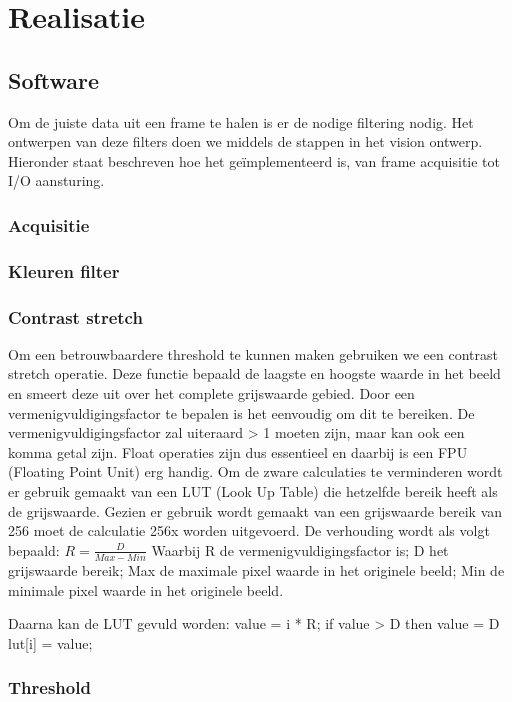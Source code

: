 \chapter{Realisatie}


\section{Software}
\label{sec:softreal}
Om de juiste data uit een frame te halen is er de nodige filtering nodig. 
Het ontwerpen van deze filters doen we middels de stappen in het vision ontwerp.
Hieronder staat beschreven hoe het geïmplementeerd is, van frame acquisitie tot 
I/O aansturing.

\subsection{Acquisitie}
\label{sub:acqreal}

\subsection{Kleuren filter}
\label{sub:kleurfilt}

\subsection{Contrast stretch}
\label{sub:contstr}
Om een betrouwbaardere threshold te kunnen maken gebruiken we een contrast stretch 
operatie. Deze functie bepaald de laagste en hoogste waarde in het beeld en smeert 
deze uit over het complete grijswaarde gebied. Door een vermenigvuldigingsfactor te 
bepalen is het eenvoudig om dit te bereiken. De vermenigvuldigingsfactor zal 
uiteraard > 1 moeten zijn, maar kan ook een komma getal zijn. Float operaties zijn 
dus essentieel en daarbij is een FPU (Floating Point Unit) erg handig. Om de 
zware calculaties te verminderen wordt er gebruik gemaakt van een LUT (Look Up Table) 
die hetzelfde bereik heeft als de grijswaarde. Gezien er gebruik wordt gemaakt van 
een grijswaarde bereik van 256 moet de calculatie 256x worden uitgevoerd.
De verhouding wordt als volgt bepaald:
$R = \frac{D}{Max - Min}$
Waarbij R de vermenigvuldigingsfactor is;
D het grijswaarde bereik;
Max de maximale pixel waarde in het originele beeld;
Min de minimale pixel waarde in het originele beeld.

Daarna kan de LUT gevuld worden:
value = i * R;
if value > D then value = D
lut[i] = value;

\subsection{Threshold}
\label{sub:threshold}

